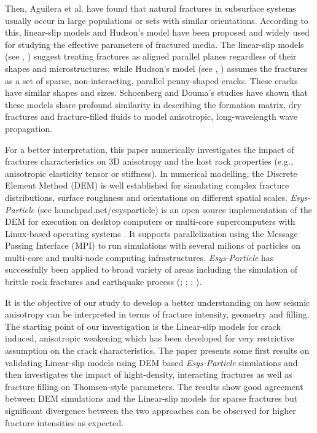 \documentclass[review,authoryear]{elsarticle}
\newcommand{\esysparticle}{\textit{Esys-Particle }}
\begin{document}
Then, Aguilera et al. \citep{aguilera1998geologic} have found that natural fractures in subsurface systems usually occur in large populations or sets with similar orientations. According to this, linear-slip models and Hudson's model have been proposed and widely used for studying the effective parameters of fractured media.
The linear-slip models (see \cite{schoenberg1980elastic}, \cite{schoenberg1983reflection}) suggest treating fractures as aligned parallel planes regardless of their shapes and microstructures; while Hudson's model (see \cite{hudson1980overall}, \cite{hudson1981wave}) assumes the fractures as a set of sparse, non-interacting, parallel penny-shaped cracks. These cracks have similar shapes and sizes. Schoenberg and Douma's studies \citep{schoenberg1988elastic} have shown that these models share profound similarity in describing the formation matrix, dry fractures and fracture-filled fluids to model anisotropic, long-wavelength wave propagation. 

For a better interpretation, this paper numerically investigates the impact of fractures characteristics on 3D anisotropy and the host rock properties (e.g., anisotropic elasticity tensor or stiffness). In numerical modelling, the Discrete Element Method (DEM) is well established for simulating complex fracture distributions, surface roughness and orientations on different spatial scales. \esysparticle (see {launchpad.net/esysparticle}) is an open source implementation of the DEM for execution on desktop computers or multi-core supercomputers with Linux-based operating systems \citep{weatherley2013esys}. It supports parallelization using the Message Passing Interface (MPI) \citep{gropp1999using} to run simulations with several milions of particles on multi-core and multi-node computing infrastructures.
\esysparticle has successfully been applied to broad variety of areas including the simulation of brittle rock fractures and earthquake process (\cite{wang2008discrete}; \cite{weatherley2010scaling}; \cite{abe2012discrete}; \cite{mora2015lattice}). 

It is the objective of our study to develop a better understanding on how seismic anisotropy can be interpreted in terms of fracture intensity, geometry and filling. The starting point of our investigation is the Linear-slip models for crack induced, anisotropic weakening which has been developed for very restrictive assumption on the crack characteristics. The paper presents some first results on validating Linear-slip models using DEM based \esysparticle simulations and then investigates the impact of hight-density, interacting fractures as well as fracture filling on Thomsen-style parameters. 
The results show good agreement between DEM simulations and the Linear-slip models for sparse fractures 
but significant divergence between the two approaches can be observed for higher fracture intensities as 
expected.
\end{document}
